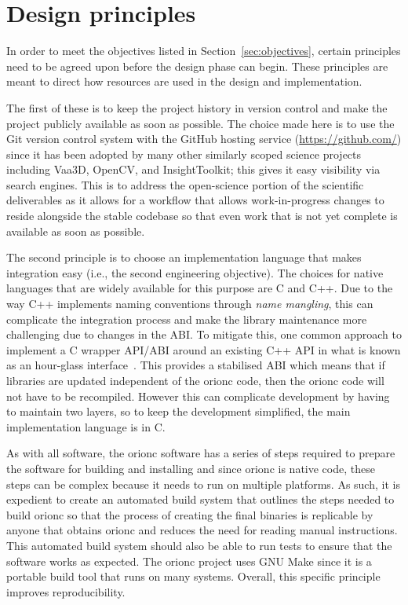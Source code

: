 \section{Design principles}

In order to meet the objectives listed in Section~\ref{sec:objectives},
certain principles need to be agreed upon before the design phase
can begin. These principles are meant to direct how resources are
used in the design and implementation.

The first of these is to keep the project history in version
control and make the project publicly available as soon as
possible. The choice made here is to use the Git version control
system with the GitHub hosting service (\url{https://github.com/})
since it has been adopted by many other similarly scoped
science projects including Vaa3D, OpenCV, and InsightToolkit; this
gives it easy visibility via search engines. This is to address
the open-science portion of the scientific deliverables as it
allows for a workflow that allows work-in-progress changes to
reside alongside the stable codebase so that even work that is not
yet complete is available as soon as possible.

The second principle is to choose an implementation language that
makes integration easy (i.e., the second engineering objective).
The choices for native languages that are widely available for
this purpose are C and C++. Due to the way C++ implements
naming conventions through \emph{name mangling}, this can
complicate the integration process and make the library
maintenance more challenging due to changes in the \acrshort{ABI}.
To mitigate this, one common approach to implement a C wrapper
\acrshort{API}/\acrshort{ABI} around an existing C++ \acrshort{API}
in what is known as an hour-glass interface~\autocite{CppCon:Hourglass:2014}.
This provides a stabilised \acrshort{ABI} which means that if
libraries are updated independent of the \gls{orionc} code, then
the \gls{orionc} code will not have to be recompiled. However this can
complicate development by having to maintain two layers, so to
keep the development simplified, the main implementation language
is in C.

As with all software, the \gls{orionc} software has a series of
steps required to prepare the software for building and
installing and since \gls{orionc} is native code, these steps can
be complex because it needs to run on multiple platforms. As such,
it is expedient to create an automated build system that outlines
the steps needed to build \gls{orionc} so that the process of
creating the final binaries is replicable by anyone that obtains
\gls{orionc} and reduces the need for reading manual instructions.
This automated build system should also be able to run tests to
ensure that the software works as expected. The \gls{orionc}
project uses GNU Make since it is a portable build tool that runs
on many systems. Overall, this specific principle improves
reproducibility.

